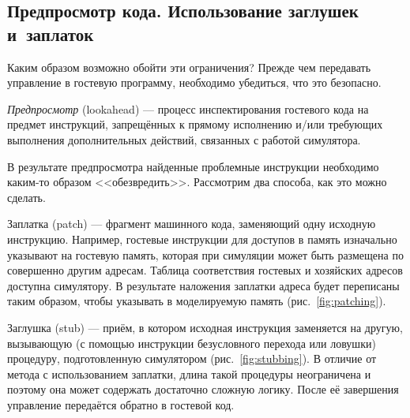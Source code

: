 \subsection[Предпросмотр кода]{Предпросмотр кода. Использование заглушек и~заплаток}

Каким образом возможно обойти эти ограничения? Прежде чем передавать управление в гостевую программу, необходимо убедиться, что это безопасно. 

\textit{Предпросмотр} (\abbr lookahead) --- процесс инспектирования гостевого кода на предмет инструкций, запрещённых к прямому исполнению и/или требующих выполнения дополнительных действий, связанных с работой симулятора.

В результате предпросмотра найденные проблемные инструкции необходимо каким-то образом <<обезвредить>>. Рассмотрим два способа, как это можно сделать.

\begin{description*}
\item[Заплатка (\abbr patch)] --- фрагмент машинного кода, заменяющий одну исходную инструкцию. Например, гостевые инструкции для доступов в память изначально указывают на гостевую память, которая при симуляции может быть размещена по совершенно другим адресам. Таблица соответствия гостевых и хозяйских адресов доступна симулятору. В результате наложения заплатки адреса будет переписаны таким образом, чтобы указывать в моделируемую память (рис.~\ref{fig:patching}). 

\item[Заглушка (\abbr stub)] --- приём, в котором исходная инструкция заменяется на другую, вызывающую (с помощью инструкции безусловного перехода или ловушки) процедуру, подготовленную симулятором (рис.~\ref{fig:stubbing}). В отличие от метода с использованием заплатки, длина такой процедуры неограничена и поэтому она может содержать достаточно сложную логику. После её завершения управление передаётся обратно в гостевой код.
\end{description*}

